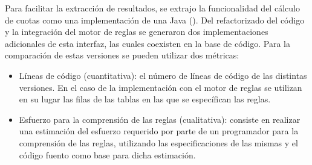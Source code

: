 Para facilitar la extracción de resultados, se extrajo la funcionalidad del cálculo de cuotas como una implementación de una Java (). Del refactorizado del código y la integración del motor de reglas se generaron dos implementaciones adicionales de esta interfaz, las cuales coexisten en la base de código. Para la comparación de estas versiones se pueden utilizar dos métricas:
\begin{itemize}
    \item Líneas de código (cuantitativa): el número de líneas de código de las distintas versiones. En el caso de la implementación con el motor de reglas se utilizan en su lugar las filas de las tablas en las que se específican las reglas.
    \item Esfuerzo para la comprensión de las reglas (cualitativa): consiste en realizar una estimación del esfuerzo requerido por parte de un programador para la comprensión de las reglas, utilizando las especificaciones de las mismas y el código fuento como base para dicha estimación.
\end{itemize}
